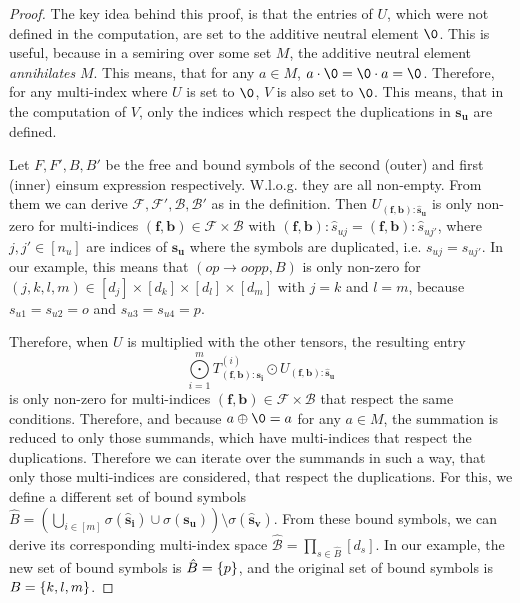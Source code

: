 \begin{proof}
    \small
    The key idea behind this proof, is that the entries of $U$, which were not defined in the computation, are set to the additive neutral element $\0$.
    This is useful, because in a semiring over some set $M$, the additive neutral element \textit{annihilates} $M$.
    This means, that for any $a \in M$, $a \cdot \0 = \0 \cdot a = \0$.
    Therefore, for any multi-index where $U$ is set to $\0$, $V$ is also set to $\0$.
    This means, that in the computation of $V$, only the indices which respect the duplications in $\bm{s_u}$ are defined.

    Let $F, F', B, B'$ be the free and bound symbols of the second (outer) and first (inner) einsum expression respectively.
    W.l.o.g. they are all non-empty.
    From them we can derive $\mathcal{F}, \mathcal{F}', \mathcal{B}, \mathcal{B}'$ as in the definition.
    Then $U_{(\bm{f}, \bm{b}): \bm{\hat{s}_u}}$ is only non-zero for multi-indices $(\bm{f}, \bm{b}) \in \mathcal{F} \times \mathcal{B}$ with $(\bm{f}, \bm{b}):\hat{s}_{uj} = (\bm{f}, \bm{b}):\hat{s}_{uj'}$, where $j,j' \in [n_u]$ are indices of $\bm{s_u}$ where the symbols are duplicated, i.e. $s_{uj} = s_{uj'}$.
    In our example, this means that $(op \rightarrow oopp, B)$ is only non-zero for $(j,k,l,m) \in [d_j] \times [d_k] \times [d_l] \times [d_m]$ with $j = k$ and $l = m$, because $s_{u1} = s_{u2} = o$ and $s_{u3} = s_{u4} = p$.

    Therefore, when $U$ is multiplied with the other tensors, the resulting entry
    $$\bigodot\limits_{i = 1}^{m} T^{(i)}_{(\bm{f}, \bm{b}): \bm{s_i}} \odot U_{(\bm{f}, \bm{b}): \bm{\hat{s}_u}}$$
    is only non-zero for multi-indices $(\bm{f}, \bm{b}) \in \mathcal{F} \times \mathcal{B}$ that respect the same conditions.
    Therefore, and because $a \oplus \0 = a$ for any $a \in M$, the summation is reduced to only those summands, which have multi-indices that respect the duplications.
    Therefore we can iterate over the summands in such a way, that only those multi-indices are considered, that respect the duplications.
    For this, we define a different set of bound symbols $\hat{B} = \left(\bigcup_{i \in [m]} \sigma(\bm{\hat{s}_i}) \cup \sigma(\bm{s_u})\right) \setminus \sigma(\bm{\hat{s}_v})$.
    From these bound symbols, we can derive its corresponding multi-index space $\mathcal{\hat{B}} = \prod_{s \in \hat{B}} [d_s]$.
    In our example, the new set of bound symbols is $\hat{B} = \lbrace p \rbrace$, and the original set of bound symbols is $B = \left\lbrace k, l, m \right\rbrace$.


\end{proof}
